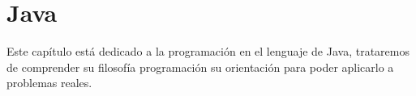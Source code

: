 \part{Java}
Este cap\'itulo est\'a dedicado a la programaci\'on en el lenguaje de Java, trataremos de comprender su filosof\'ia
programaci\'on su orientaci\'on para poder aplicarlo a problemas reales.


